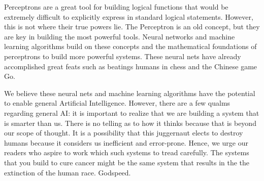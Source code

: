 Perceptrons are a great tool for building logical functions that would be extremely difficult to explicitly express in standard logical statements. However, this is not where their true powers lie. The Perceptron is an old concept, but they are key in building the most powerful tools. Neural networks and machine learning algorithms build on these concepts and the mathematical foundations of perceptrons to build more powerful systems. These neural nets have already accomplished great feats such as beatings humans in chess and the Chinese game Go. 

We believe these neural nets and machine learning algorithms have the potential to enable general Artificial Intelligence. However, there are a few qualms regarding general AI: it is important to realize that we are building a system that is smarter than us. There is no telling as to how it thinks because that is beyond our scope of thought. It is a possibility that this juggernaut elects to destroy humans because it considers us inefficient and error-prone. Hence, we urge our readers who aspire to work which such systems to tread carefully. The systems that you build to cure cancer might be the same system that results in the the extinction of the human race. Godspeed.